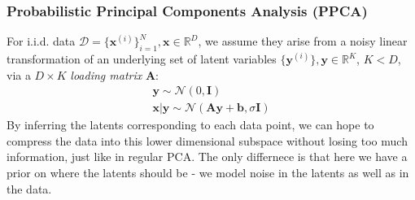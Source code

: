 \documentclass[a4paper]{article}
\begin{document}
\subsubsection{Probabilistic Principal Components Analysis (PPCA)}
For i.i.d. data $\mathcal{D} = \{\mathbf{x}^{(i)}\}_{i=1}^N, \mathbf{x}\in\mathbb{R}^D$, we assume they arise from a noisy linear transformation of an underlying set of latent variables $\{\mathbf{y}^{(i)}\}, \mathbf{y}\in\mathbb{R}^K$, $K<D$, via a $D\times K$ \emph{loading matrix} $\mathbf{A}$:
\begin{gather*}
\mathbf{y} \sim \mathcal{N}(0,\mathbf{I}) \\
\mathbf{x}|\mathbf{y} \sim \mathcal{N}(\mathbf{Ay+b},\sigma \mathbf{I})
\end{gather*}
By inferring the latents corresponding to each data point, we can hope to compress the data into this lower dimensional subspace without losing too much information, just like in regular PCA. The only differnece is that here we have a prior on where the latents should be - we model noise in the latents as well as in the data.
\end{document}
